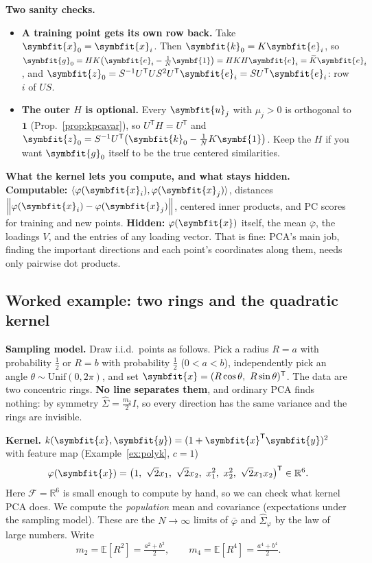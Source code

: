 \documentclass[11pt]{article}
\newcommand{\bm}[1]{\symbfit{#1}}
\newcommand{\R}{\mathbb{R}}
\newcommand{\vx}{\bm{x}}
\newcommand{\vy}{\bm{y}}
\newcommand{\vu}{\bm{u}}
\newcommand{\one}{\symbf{1}}
\newcommand{\Sig}{\widehat{\Sigma}}
\newcommand{\T}{^{\mathsf T}}
\newcommand{\norm}[1]{\left\lVert #1\right\rVert}
\begin{document}
\begin{intuition}
\textbf{Two sanity checks.}
\begin{itemize}[nosep]
\item \textbf{A training point gets its own row back.} Take $\vx_0=\vx_i$. Then $\bm k_0=K\bm e_i$, so $\bm g_0=HK\big(\bm e_i-\tfrac1N\one\big)=HKH\bm e_i=\widetilde K\bm e_i$, and
$\bm z_0=S^{-1}U\T US^2U\T\bm e_i=SU\T\bm e_i$: row $i$ of $US$. \checkmark
\item \textbf{The outer $H$ is optional.} Every $\vu_j$ with $\mu_j>0$ is orthogonal to $\one$ (Prop.~\ref{prop:kpcavar}), so $U\T H=U\T$ and
$\bm z_0=S^{-1}U\T\big(\bm k_0-\tfrac1NK\one\big)$. Keep the $H$ if you want $\bm g_0$ itself to be the true centered similarities.
\end{itemize}
\end{intuition}

\begin{careful}
\textbf{What the kernel lets you compute, and what stays hidden.}
\textbf{Computable:} $\langle\varphi(\vx_i),\varphi(\vx_j)\rangle$, distances $\norm{\varphi(\vx_i)-\varphi(\vx_j)}$, centered inner products, and PC scores for training
and new points. \textbf{Hidden:} $\varphi(\vx)$ itself, the mean $\bar\varphi$, the loadings $V$, and the entries of any loading vector. That is fine:
PCA's main job, finding the important directions and each point's coordinates along them, needs only pairwise dot products.
\end{careful}

\subsection{Worked example: two rings and the quadratic kernel}

\textbf{Sampling model.} Draw i.i.d.\ points as follows. Pick a radius
$R=a$ with probability $\tfrac12$ or $R=b$ with probability $\tfrac12$ ($0<a<b$), independently pick an
angle $\theta\sim\mathrm{Unif}(0,2\pi)$, and set $\vx=(R\cos\theta,\ R\sin\theta)\T$.
The data are two concentric rings. \textbf{No line separates them}, and ordinary PCA finds nothing:
by symmetry $\Sig=\tfrac{m_2}2I$, so every direction has the same variance and the rings are invisible.

\textbf{Kernel.} $k(\vx,\vy)=(1+\vx\T\vy)^2$ with feature map (Example~\ref{ex:polyk}, $c=1$)
\[
\varphi(\vx)=\big(1,\ \sqrt2x_1,\ \sqrt2x_2,\ x_1^2,\ x_2^2,\ \sqrt2x_1x_2\big)\T\in\R^6 .
\]
Here $\mathcal F=\R^6$ is small enough to compute by hand, so we can check what kernel PCA does.
We compute the \emph{population} mean and covariance (expectations under the sampling model).
These are the $N\to\infty$ limits of $\bar{\varphi}$ and $\Sig_\varphi$ by the law of large numbers.
Write
\[
m_2=\mathbb E[R^2]=\tfrac{a^2+b^2}2,\qquad m_4=\mathbb E[R^4]=\tfrac{a^4+b^4}2 .
\]
\end{document}
